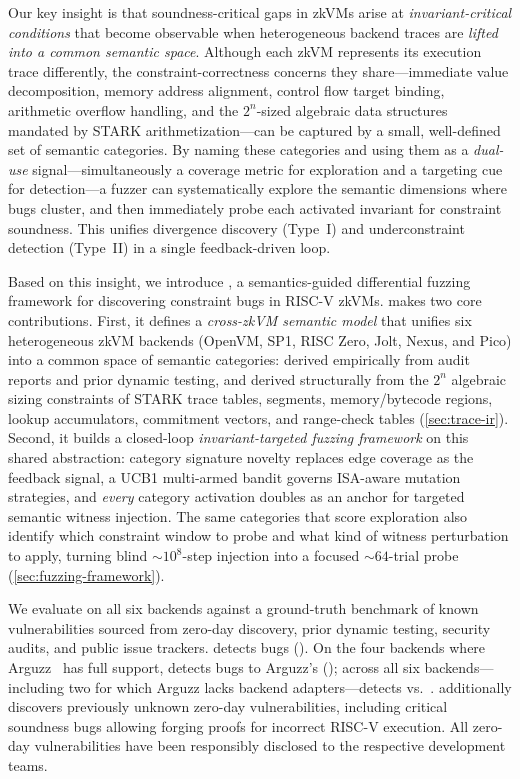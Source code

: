 Our key insight is that soundness-critical gaps in zkVMs arise at \emph{invariant-critical conditions} that become observable when heterogeneous backend traces are \emph{lifted into a common semantic space}. Although each zkVM represents its execution trace differently, the constraint-correctness concerns they share---immediate value decomposition, memory address alignment, control flow target binding, arithmetic overflow handling, and the $2^n$-sized algebraic data structures mandated by STARK arithmetization---can be captured by a small, well-defined set of semantic categories. By naming these categories and using them as a \emph{dual-use} signal---simultaneously a coverage metric for exploration and a targeting cue for detection---a fuzzer can systematically explore the semantic dimensions where bugs cluster, and then immediately probe each activated invariant for constraint soundness. This unifies divergence discovery (Type~I) and underconstraint detection (Type~II) in a single feedback-driven loop.

Based on this insight, we introduce \tool, a semantics-guided differential fuzzing framework for discovering constraint bugs in RISC-V zkVMs. \tool makes two core contributions. First, it defines a \emph{cross-zkVM semantic model} that unifies six heterogeneous zkVM backends (OpenVM, SP1, RISC Zero, Jolt, Nexus, and Pico) into a common space of  semantic categories:  derived empirically from audit reports and prior dynamic testing, and  derived structurally from the $2^n$ algebraic sizing constraints of STARK trace tables, segments, memory/bytecode regions, lookup accumulators, commitment vectors, and range-check tables (\autoref{sec:trace-ir}). Second, it builds a closed-loop \emph{invariant-targeted fuzzing framework} on this shared abstraction: category signature novelty replaces edge coverage as the feedback signal, a UCB1 multi-armed bandit governs  ISA-aware mutation strategies, and \emph{every} category activation doubles as an anchor for targeted semantic witness injection. The same categories that score exploration also identify which constraint window to probe and what kind of witness perturbation to apply, turning blind $\sim$$10^8$-step injection into a focused $\sim$$64$-trial probe (\autoref{sec:fuzzing-framework}).

We evaluate \tool on all six backends against a ground-truth benchmark of  known vulnerabilities sourced from zero-day discovery, prior dynamic testing, security audits, and public issue trackers. \tool detects  bugs (). On the four backends where Arguzz~\cite{arguzz} has full support, \tool detects  bugs to Arguzz's  (\tbd{$1.5\times$}); across all six backends---including two for which Arguzz lacks backend adapters---\tool detects  vs.\ . \tool additionally discovers  previously unknown zero-day vulnerabilities, including  critical soundness bugs allowing forging proofs for incorrect RISC-V execution. All zero-day vulnerabilities have been responsibly disclosed to the respective development teams.

